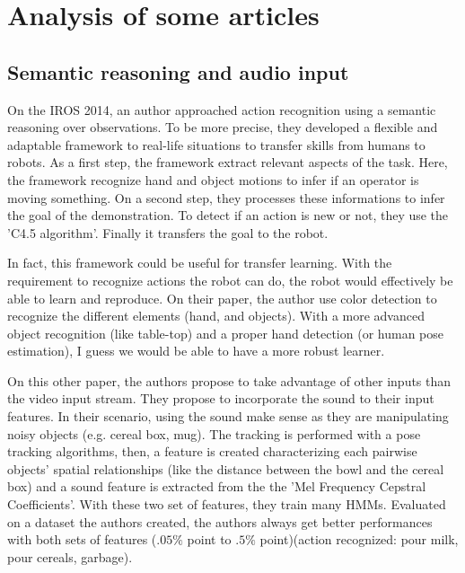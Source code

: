 \documentclass[a4paper]{article}
\begin{document}
	\section{Analysis of some articles}

		\subsection{Semantic reasoning and audio input}
			On the IROS 2014, an author\cite{ramirez2014automatic} approached action recognition using a semantic reasoning over observations. To be more precise, they developed a flexible and adaptable framework to real-life situations to transfer skills from humans to robots. 
			As a first step, the framework extract relevant aspects of the task. Here, the framework recognize hand and object motions to infer if an operator is moving something. On a second step, they processes these informations to infer the goal of the demonstration. To detect if an action is new or not, they use the 'C4.5 algorithm'. Finally it transfers the goal to the robot. 

			\begin{mdframed}[backgroundcolor = gray!30]
				In fact, this framework could be useful for transfer learning. With the requirement to recognize actions the robot can do, the robot would effectively be able to learn and reproduce. On their paper, the author use color detection to recognize the different elements (hand, and objects). With a more advanced object recognition (like table-top) and a proper hand detection (or human pose estimation\cite{tompson2014joint}), I guess we would be able to have a more robust learner.
			\end{mdframed}


			On this other paper\cite{pieropan2014audio}, the authors propose to take advantage of other inputs than the video input stream. They propose to incorporate the sound to their input features. In their scenario, using the sound make sense as they are manipulating noisy objects (e.g. cereal box, mug). The tracking is performed with a pose tracking algorithms, then, a feature is created characterizing each pairwise objects’ spatial relationships (like the distance between the bowl and the cereal box) and a sound feature is extracted from the the 'Mel Frequency Cepstral Coefficients'. With these two set of features, they train many HMMs. Evaluated on a dataset the authors created, the authors always get better performances with both sets of features ($.05\%$ point to $.5 \%$ point)(action recognized: pour milk, pour cereals, garbage).
\end{document}
